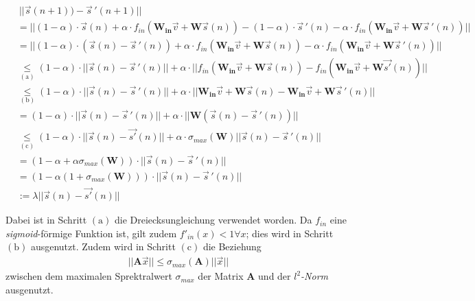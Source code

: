 \begin{appendices}
\begin{align*}
&~||\vec{s}(n+1))- \vec{s}\,'(n+1)|| \\
&= ||(1 - \alpha) \cdot \vec{s}(n)  + \alpha \cdot f_{in}\left( \mathbf{W_{in}} \vec{v} + \mathbf{W} \vec{s}(n) \right) - (1 - \alpha) \cdot \vec{s}\,'(n)  - \alpha \cdot f_{in}\left( \mathbf{W_{in}} \vec{v} + \mathbf{W} \vec{s}\,'(n) \right)|| \\
&= || (1-\alpha)\cdot(\vec{s}(n)-\vec{s}\,'(n)) + \alpha \cdot f_{in}\left( \mathbf{W_{in}} \vec{v} + \mathbf{W} \vec{s}(n) \right) - \alpha \cdot f_{in}\left( \mathbf{W_{in}} \vec{v} + \mathbf{W} \vec{s}\,'(n) \right) ||\\
&\underset{\mathrm{(a)}}{\leq} (1-\alpha)\cdot|| \vec{s}(n)-\vec{s}\,'(n)|| + \alpha \cdot ||f_{in}\left( \mathbf{W_{in}} \vec{v} + \mathbf{W} \vec{s}(n) \right) - f_{in}\left( \mathbf{W_{in}} \vec{v} + \mathbf{W} \vec{s'}(n) \right) ||\\
&\underset{\mathrm{(b)}}{\leq} (1-\alpha)\cdot|| \vec{s}(n)-\vec{s}\,'(n)|| + \alpha \cdot ||\mathbf{W_{in}} \vec{v} + \mathbf{W} \vec{s}(n)- \mathbf{W_{in}} \vec{v} + \mathbf{W} \vec{s}\,'(n) ||\\
&= (1-\alpha)\cdot|| \vec{s}(n)-\vec{s}\,'(n)|| + \alpha \cdot ||\mathbf{W} \left(\vec{s}(n)- \vec{s}\,'(n) \right)||\\
&\underset{\mathrm{(c)}}{\leq} (1-\alpha)\cdot ||\vec{s}(n)-\vec{s'}(n)|| + \alpha \cdot \sigma_{max}\left(\mathbf{W}\right)||\vec{s}(n)- \vec{s}\,'(n) ||\\
&= \left(1-\alpha+\alpha\sigma_{max} \left(\mathbf{W} \right) \right) \cdot ||\vec{s}(n)-\vec{s}\,'(n)|| \\
&= \left(1-\alpha(1+\sigma_{max} \left(\mathbf{W} \right)) \right) \cdot ||\vec{s}(n)-\vec{s}\,'(n)|| \\
&:= \lambda ||\vec{s}(n)-\vec{s'}(n)||
\end{align*}

Dabei ist in Schritt $\mathrm{(a)}$ die Dreiecksungleichung verwendet worden. Da $f_{in}$ eine \textit{sigmoid}-förmige Funktion ist, gilt zudem $f'_{in}(x) < 1 \forall x$; dies wird in Schritt $\mathrm{(b)}$ ausgenutzt. Zudem wird in Schritt $\mathrm{(c)}$ die Beziehung
\begin{align*}
||\mathbf{A} \vec{x}|| \leq \sigma_{max}\left(\mathbf{A} \right) ||\vec{x}||
\end{align*}
zwischen dem maximalen Sprektralwert $\sigma_{max}$ der Matrix $\mathbf{A}$ und der \textit{$l^2$-Norm} ausgenutzt.\\


\end{appendices}
